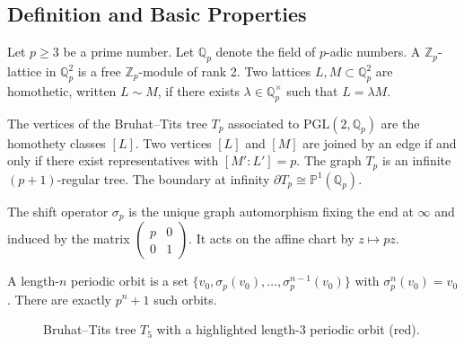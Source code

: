 \documentclass[11pt,a4paper]{amsart}
\begin{document}
\subsection{Definition and Basic Properties}

Let \(p \geq 3\) be a prime number. Let \(\mathbb{Q}_p\) denote the field of \(p\)-adic numbers. A \(\mathbb{Z}_p\)-lattice in \(\mathbb{Q}_p^2\) is a free \(\mathbb{Z}_p\)-module of rank 2. Two lattices \(L, M \subset \mathbb{Q}_p^2\) are homothetic, written \(L \sim M\), if there exists \(\lambda \in \mathbb{Q}_p^\times\) such that \(L = \lambda M\).

The vertices of the Bruhat--Tits tree \(T_p\) associated to \(\mathrm{PGL}(2, \mathbb{Q}_p)\) are the homothety classes \([L]\). Two vertices \([L]\) and \([M]\) are joined by an edge if and only if there exist representatives with \([M' : L'] = p\). The graph \(T_p\) is an infinite \((p+1)\)-regular tree. The boundary at infinity \(\partial T_p \cong \mathbb{P}^1(\mathbb{Q}_p)\).

The shift operator \(\sigma_p\) is the unique graph automorphism fixing the end at \(\infty\) and induced by the matrix \(\begin{pmatrix} p & 0 \\ 0 & 1 \end{pmatrix}\). It acts on the affine chart by \(z \mapsto pz\).

A length-\(n\) periodic orbit is a set \(\{v_0, \sigma_p(v_0), \dots, \sigma_p^{n-1}(v_0)\}\) with \(\sigma_p^n(v_0) = v_0\). There are exactly \(p^n + 1\) such orbits.

\begin{figure}[htbp]
\centering
{}
\caption{Bruhat--Tits tree \(T_5\) with a highlighted length-3 periodic orbit (red).}
\label{fig:T5-orbit}
\end{figure}
\end{document}
